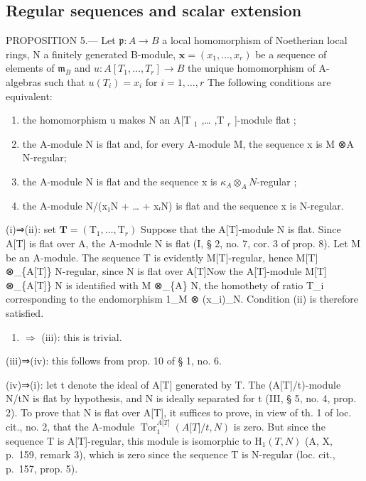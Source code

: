\subsection{Regular sequences and scalar extension}

PROPOSITION 5.--- Let \(\mathfrak{p}: A \to B\) a local homomorphism of Noetherian local rings, N a finitely generated B-module, \(\mathbf{x} = (x_1, \ldots, x_r)\) be a sequence of elements of \(\mathfrak{m}_B\) and \(u: A[T_1, \ldots, T_r] \longrightarrow B\) the unique homomorphism of A-algebras such that \(u(T_i) = x_i\) for \(i = 1, \ldots, r\) The following conditions are equivalent:

\begin{enumerate}
\def\labelenumi{(\roman{enumi})}
\item
  the homomorphism u makes N an A{[}T \(_{1}\) ,\ldots{} ,T \(_{r}\) {]}-module flat ;
\item
  the A-module N is flat and, for every A-module M, the sequence x is M ⊗A N-regular;
\item
  the A-module N is flat and the sequence x is \(\kappa_{A} \otimes_{A} N\)-regular ;
\item
  the A-module N/(x₁N + \ldots{} + xᵣN) is flat and the sequence x is N-regular.
\end{enumerate}

(i)⇒(ii): set \(\mathbf{T} = (\mathrm{T}_{1}, \ldots, \mathrm{T}_{r})\) Suppose that the A{[}T{]}-module N is flat. Since A{[}T{]} is flat over A, the A-module N is flat (I, § 2, no. 7, cor. 3 of prop. 8). Let M be an A-module. The sequence T is evidently M{[}T{]}-regular, hence M{[}T{]} ⊗\_\{A{[}T{]}\} N-regular, since N is flat over A{[}T{]}Now the A{[}T{]}-module M{[}T{]} ⊗\_\{A{[}T{]}\} N is identified with M ⊗\_\{A\} N, the homothety of ratio T\_i corresponding to the endomorphism 1\_M ⊗ (x\_i)\_N. Condition (ii) is therefore satisfied.

\begin{enumerate}
\def\labelenumi{(\roman{enumi})}
\setcounter{enumi}{1}
\tightlist
\item
  \(\Rightarrow\) (iii): this is trivial.
\end{enumerate}

(iii)⇒(iv): this follows from prop. 10 of § 1, no. 6.

(iv)⇒(i): let t denote the ideal of A{[}T{]} generated by T. The (A{[}T{]}/t)-module N/tN is flat by hypothesis, and N is ideally separated for t (III, § 5, no. 4, prop. 2). To prove that N is flat over A{[}T{]}, it suffices to prove, in view of th. 1 of loc. cit., no. 2, that the A-module \(\operatorname{Tor}_{1}^{A{[}T{]}}(A{[}T{]}/t,N)\) is zero. But since the sequence T is A{[}T{]}-regular, this module is isomorphic to \(\mathrm{H}_{1}(T,N)\) (A, X, p.~159, remark 3), which is zero since the sequence T is N-regular (loc. cit., p.~157, prop. 5).

